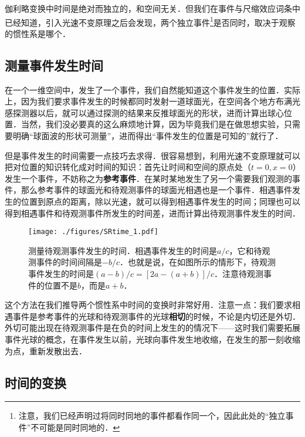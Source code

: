 

伽利略变换中时间是绝对而独立的，和空间无关．但我们在事件与尺缩效应词条中已经知道，引入光速不变原理之后会发现，两个独立事件\footnote{注意，我们已经声明过将同时同地的事件都看作同一个，因此此处的“独立事件”不可能是同时同地的．}是否同时，取决于观察的惯性系是哪个．

\subsection{测量事件发生时间}

在一个一维空间中，发生了一个事件，我们自然能知道这个事件发生的位置．实际上，因为我们要求事件发生的时候都同时发射一道球面光，在空间各个地方布满光感探测器以后，就可以通过探测的结果来反推球面光的形状，进而计算出球心位置．当然，我们没必要真的这么麻烦地计算，因为毕竟我们是在做思想实验，只需要明确“球面波的形状可测量”，进而得出“事件发生的位置是可知的”就行了．

但是事件发生的时间需要一点技巧去求得．很容易想到，利用光速不变原理就可以把对位置的知识转化成对时间的知识：首先让时间和空间的原点处（$t=0, x=0$）发生一个事件，不妨称之为\textbf{参考事件}．在某时某地发生了另一个需要我们观测的事件，那么参考事件的球面光和待观测事件的球面光相遇也是一个事件．相遇事件发生的位置到原点的距离，除以光速，就可以得到相遇事件发生的时间；同理也可以得到相遇事件和待观测事件所发生的时间差，进而计算出待观测事件发生的时间．

\begin{figure}[ht]
\centering
\texttt{[image: ./figures/SRtime\_1.pdf]}
\caption{测量待观测事件发生的时间．相遇事件发生的时间是$a/c$，它和待观测事件的时间间隔是$-b/c$．也就是说，在如图所示的情形下，待观测事件发生的时间是$(a-b)/c=[2a-(a+b)]/c$．注意待观测事件的位置不是$b$，而是$a+b$．} \label{SRtime_fig1}
\end{figure}

这个方法在我们推导两个惯性系中时间的变换时非常好用．注意一点：我们要求相遇事件是参考事件的光球和待观测事件的光球\textbf{相切}的时候，不论是内切还是外切．外切可能出现在待观测事件是在负的时间上发生的的情况下——这时我们需要拓展事件光球的概念，在事件发生以前，光球向事件发生地收缩，在发生的那一刻收缩为点，重新发散出去．

\subsection{时间的变换}

